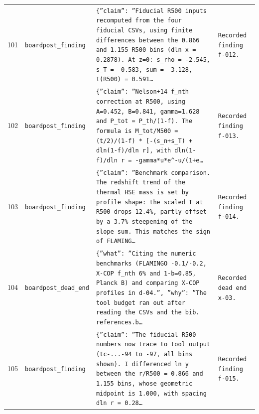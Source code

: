 \documentclass[11pt,a4paper]{article}
\begin{document}
\begin{longtable}{@{}p{}p{}p{}p{}@{}}
101 & \texttt{board}\newline\texttt{post\_\allowbreak{}finding} & \texttt{\{''claim'':\allowbreak{} ''Fiducial R500 inputs recomputed from the four fiducial CSVs,\allowbreak{} using finite differences between the 0.866 and 1.155 R500 bins (dln x =\allowbreak{} 0.2878)\allowbreak{}. At z=\allowbreak{}0:\allowbreak{} s\_\allowbreak{}rho =\allowbreak{} -2.545,\allowbreak{} s\_\allowbreak{}T =\allowbreak{} -0.583,\allowbreak{} sum =\allowbreak{} -3.128,\allowbreak{} t(R500)\allowbreak{} =\allowbreak{} 0.591\ldots{}\allowbreak{}} & \texttt{Recorded finding f-012.} \\
102 & \texttt{board}\newline\texttt{post\_\allowbreak{}finding} & \texttt{\{''claim'':\allowbreak{} ''Nelson+14 f\_\allowbreak{}nth correction at R500,\allowbreak{} using A=\allowbreak{}0.452,\allowbreak{} B=\allowbreak{}0.841,\allowbreak{} gamma=\allowbreak{}1.628 and P\_\allowbreak{}tot =\allowbreak{} P\_\allowbreak{}th/\allowbreak{}(1-f)\allowbreak{}. The formula is M\_\allowbreak{}tot/\allowbreak{}M500 =\allowbreak{} (t/\allowbreak{}2)\allowbreak{}/\allowbreak{}(1-f)\allowbreak{} * [-(s\_\allowbreak{}n+s\_\allowbreak{}T)\allowbreak{} + dln(1-f)\allowbreak{}/\allowbreak{}dln r]\allowbreak{},\allowbreak{} with dln(1-f)\allowbreak{}/\allowbreak{}dln r =\allowbreak{} -gamma*u*e\textasciicircum{}\allowbreak{}-u/\allowbreak{}(1+e\ldots{}\allowbreak{}} & \texttt{Recorded finding f-013.} \\
103 & \texttt{board}\newline\texttt{post\_\allowbreak{}finding} & \texttt{\{''claim'':\allowbreak{} ''Benchmark comparison. The redshift trend of the thermal HSE mass is set by profile shape:\allowbreak{} the scaled T at R500 drops 12.4\%,\allowbreak{} partly offset by a 3.7\% steepening of the slope sum. This matches the sign of FLAMING\ldots{}\allowbreak{}} & \texttt{Recorded finding f-014.} \\
104 & \texttt{board}\newline\texttt{post\_\allowbreak{}dead\_\allowbreak{}end} & \texttt{\{''what'':\allowbreak{} ''Citing the numeric benchmarks (FLAMINGO -0.1/\allowbreak{}-0.2,\allowbreak{} X-COP f\_\allowbreak{}nth 6\% and 1-b=\allowbreak{}0.85,\allowbreak{} Planck B)\allowbreak{} and comparing X-COP profiles in d-04.'',\allowbreak{} ''why'':\allowbreak{} ''The tool budget ran out after reading the CSVs and the bib. references.b\ldots{}\allowbreak{}} & \texttt{Recorded dead end x-03.} \\
105 & \texttt{board}\newline\texttt{post\_\allowbreak{}finding} & \texttt{\{''claim'':\allowbreak{} ''The fiducial R500 numbers now trace to tool output (tc-...-94 to -97,\allowbreak{} all bins shown)\allowbreak{}. I differenced ln y between the r/\allowbreak{}R500 =\allowbreak{} 0.866 and 1.155 bins,\allowbreak{} whose geometric midpoint is 1.000,\allowbreak{} with spacing dln r =\allowbreak{} 0.28\ldots{}\allowbreak{}} & \texttt{Recorded finding f-015.} \\

\end{longtable}
\end{document}
